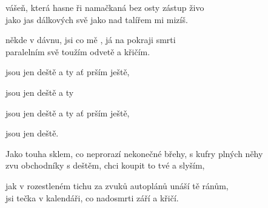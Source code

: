 
\zs
{} vášeň, která hasne ři
namačkaná bez osty zástup živo \\
jako jas dálkových svě jako nad talířem 
mi mizíš.

 někde v dávnu,
jsi  co mě , já na pokraji smrti \\
 paralelním svě toužím  odvetě
a křičím.
\ks
\zr

 jsou jen  deště a ty  ať prším ještě,

 jsou jen  deště a ty 

 jsou jen  deště a ty  ať prším 
ještě,

 jsou jen  deště.

\kr
\zs

Jako touha sklem, co neprorazí
nekonečné břehy, s kufry plných něhy \\
zvu obchodníky s deštěm, chci koupit to tvé 
a slyším,

jak v rozestleném tichu
za zvuků autoplánů unáší tě ránům, \\
jsi tečka v kalendáři, co nadosmrti září
a křičí.

\ks
\zr
\kr
\zs

  
\ks
\zr
\kr
\kp


